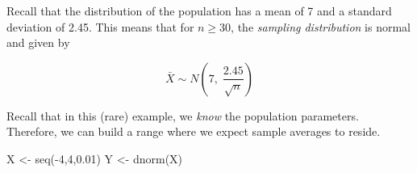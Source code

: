 \documentclass[
]{book}
\newenvironment{Shaded}{\begin{snugshade}}{\end{snugshade}}
\newcommand{\DecValTok}[1]{\textcolor[rgb]{0.00,0.00,0.81}{#1}}
\newcommand{\FloatTok}[1]{\textcolor[rgb]{0.00,0.00,0.81}{#1}}
\newcommand{\FunctionTok}[1]{\textcolor[rgb]{0.00,0.00,0.00}{#1}}
\newcommand{\NormalTok}[1]{#1}
\newcommand{\OtherTok}[1]{\textcolor[rgb]{0.56,0.35,0.01}{#1}}
\newcommand{\SpecialCharTok}[1]{\textcolor[rgb]{0.00,0.00,0.00}{#1}}
\begin{document}
Recall that the distribution of the population has a mean of 7 and a standard deviation of 2.45. This means that for \(n \geq 30\), the \emph{sampling distribution} is normal and given by

\[\bar{X} \sim N \left( 7, \; \frac{2.45}{\sqrt{n}} \right)\]

Recall that in this (rare) example, we \emph{know} the population parameters. Therefore, we can build a range where we expect sample averages to reside.

\begin{Shaded}
\begin{Highlighting}[]
\NormalTok{X }\OtherTok{\textless{}{-}} \FunctionTok{seq}\NormalTok{(}\SpecialCharTok{{-}}\DecValTok{4}\NormalTok{,}\DecValTok{4}\NormalTok{,}\FloatTok{0.01}\NormalTok{)}
\NormalTok{Y }\OtherTok{\textless{}{-}} \FunctionTok{dnorm}\NormalTok{(X)}


\end{Highlighting}
\end{Shaded}
\end{document}
